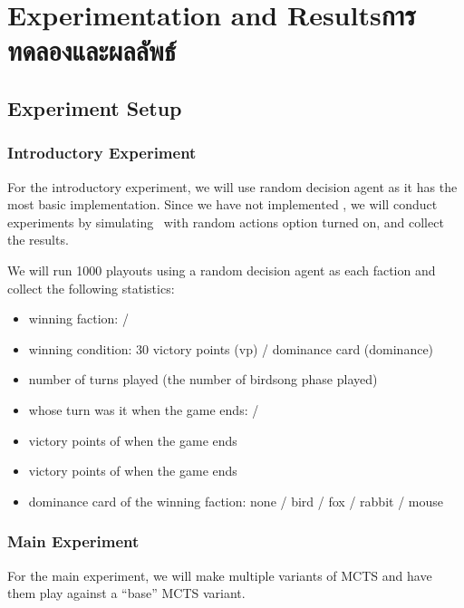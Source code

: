 \chapter{
    \ifenglish Experimentation and Results\else การทดลองและผลลัพธ์\fi
}



\section{Experiment Setup}

\subsection{Introductory Experiment}
For the introductory experiment, we will use random decision agent as it has the most basic implementation. Since we have not implemented \RootAI, we will conduct experiments by simulating \RootOurs \ with random actions option turned on, and collect the results. 

We will run 1000 \glspl{playout} using a random decision agent as each faction and collect the following statistics:
\begin{itemize}
    \item winning faction: \Marquise{} / \Eyrie
    \item winning condition: 30 victory points (vp) / dominance card (dominance)
    \item number of turns played (the number of birdsong phase played)
    \item whose turn was it when the game ends: \Marquise{} / \Eyrie
    \item victory points of \Marquise{} when the game ends
    \item victory points of \Eyrie{} when the game ends
    \item dominance card of the winning faction: none / bird / fox / rabbit / mouse
\end{itemize}

\subsection{Main Experiment}
For the main experiment, we will make multiple variants of MCTS and have them play against a ``base'' MCTS variant.

